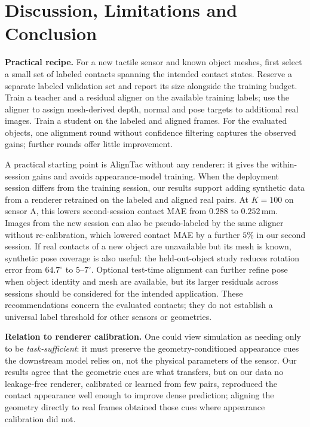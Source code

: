 \section{Discussion, Limitations and Conclusion}

\noindent\textbf{Practical recipe.}
For a new tactile sensor and known object meshes, first select a small set of labeled contacts spanning the intended contact states. Reserve a separate labeled validation set and report its size alongside the training budget. Train a teacher and a residual aligner on the available training labels; use the aligner to assign mesh-derived depth, normal and pose targets to additional real images. Train a student on the labeled and aligned frames. For the evaluated objects, one alignment round without confidence filtering captures the observed gains; further rounds offer little improvement.

A practical starting point is AlignTac without any renderer: it gives the within-session gains and avoids appearance-model training. When the deployment session differs from the training session, our results support adding synthetic data from a renderer retrained on the labeled and aligned real pairs. At $K=100$ on sensor A, this lowers second-session contact MAE from $0.288$ to $0.252\,$mm. Images from the new session can also be pseudo-labeled by the same aligner without re-calibration, which lowered contact MAE by a further $5\%$ in our second session. If real contacts of a new object are unavailable but its mesh is known, synthetic pose coverage is also useful: the held-out-object study reduces rotation error from $64.7^\circ$ to $5$--$7^\circ$. Optional test-time alignment can further refine pose when object identity and mesh are available, but its larger residuals across sessions should be considered for the intended application. These recommendations concern the evaluated contacts; they do not establish a universal label threshold for other sensors or geometries.

\noindent\textbf{Relation to renderer calibration.} One could view simulation as needing only to be \emph{task-sufficient}: it must preserve the geometry-conditioned appearance cues the downstream model relies on, not the physical parameters of the sensor. Our results agree that the geometric cues are what transfers, but on our data no leakage-free renderer, calibrated or learned from few pairs, reproduced the contact appearance well enough to improve dense prediction; aligning the geometry directly to real frames obtained those cues where appearance calibration did not.

